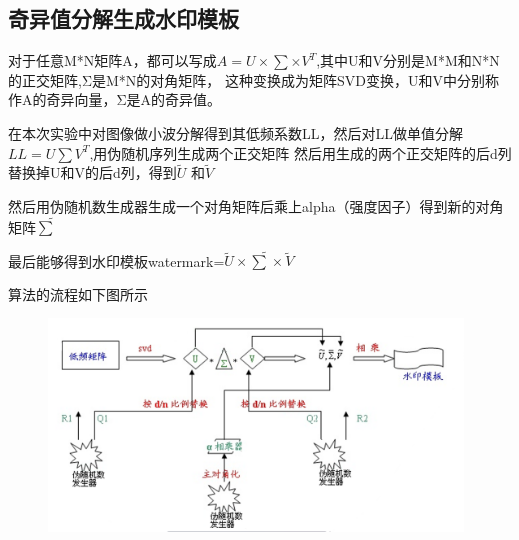 \documentclass[a4paper,11pt,UTF8]{ctexart}
\newcommand{\bottomcaption}{%
\setlength{\abovecaptionskip}{6pt}%
\setlength{\belowcaptionskip}{6pt}%
\caption}
\newcommand{\xiaowuhao}{\fontsize{9pt}{\baselineskip}\selectfont}   %
\begin{document}
  \subsection{奇异值分解生成水印模板}
    对于任意M*N矩阵A，都可以写成$A=U\times \sum \times V^{T} $,其中U和V分别是M*M和N*N的正交矩阵,Σ是M*N的对角矩阵，
    这种变换成为矩阵SVD变换，U和V中分别称作A的奇异向量，Σ是A的奇异值。\par
    在本次实验中对图像做小波分解得到其低频系数LL，然后对LL做单值分解$LL=U\sum V^{T} $,用伪随机序列生成两个正交矩阵
    然后用生成的两个正交矩阵的后d列替换掉U和V的后d列，得到$\widetilde{U}$ 和$\widetilde{V}$\par
    然后用伪随机数生成器生成一个对角矩阵后乘上alpha（强度因子）得到新的对角矩阵$\widetilde{ \sum}$\par
    最后能够得到水印模板watermark=$\widetilde{U}\times \widetilde{ \sum}\times \widetilde{V}$\par
    算法的流程如下图所示
    \begin{figure}[H]
      \centering
      \includegraphics[width=11cm]{SVD_yuanli.png}
      \bottomcaption{\xiaowuhao{SVD生成水印模板流程}}
    \end{figure}
\end{document}
